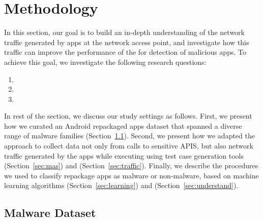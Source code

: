 \section{Methodology}\label{sec:Methodology}


In this section, our goal is to build an in-depth understanding of the network traffic generated by apps at the network access point, and investigate how this traffic can improve the performance of the \mas for detection of malicious apps. To achieve this goal, we investigate the following research questions:


\begin{enumerate}[(RQ1)]
\item \rqa
\item \rqb
\item \rqc
\end{enumerate}

In rest of the section, we discuss our study settings as follows. First, we present how we curated an Android repackaged apps dataset that spanned a diverse range of malware families (Section~\ref{sec:dataset}). Second, we present how we adapted the
\mas approach to collect data not only from calls to sensitive APIS, but also network traffic generated by the apps while executing using test case generation tools (Section~\ref{sec:mas}) and (Section~\ref{sec:traffic}). Finally, we describe the procedures we used to classify repackage apps as malware or non-malware, based on machine learning algorithms (Section~\ref{sec:learning}) and (Section~\ref{sec:understand}).

\subsection{Malware Dataset}\label{sec:dataset}


